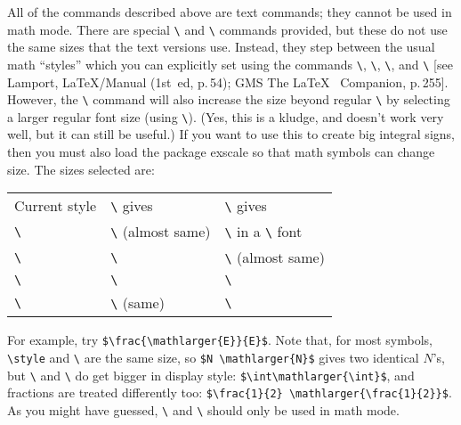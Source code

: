 \documentclass[pagesize=auto]{scrartcl}
\makeatletter
\newcommand*{\pkg}[1]{\textsf{#1}}
\newcommand*{\cs}[1]{\texttt{\textbackslash#1}}
\newcommand*{\cmd}[1]{\cs{\expandafter\@gobble\string#1}}
\makeatother
\begin{document}
\enlargethispage{-5\baselineskip}

All of the commands described above are text commands; they cannot be used
in math mode.  There are special \cmd{\mathsmaller} and \cmd{\mathlarger} commands
provided, but these do not use the same sizes that the text versions use.
Instead, they step between the usual math ``styles'' which you can explicitly
set using the commands \cmd{\displaystyle}, \cmd{\textstyle}, \cmd{\scriptstyle}, and
\cmd{\scriptscriptstyle} [see Lamport, \LaTeX/Manual (1st~ed, p.\,54); GMS The \LaTeX\ %
Companion, p.\,255]\@.  However, the \cmd{\mathlarger} command will also increase the
size beyond regular \cmd{\displaystyle} by selecting a larger regular font size
(using \cmd{\larger})\@.  (Yes, this is a kludge, and doesn't work very well, but 
it can still be useful.)  If you want to use this to create big integral 
signs, then you must also load the package \pkg{exscale} so that math symbols
can change size.  The sizes selected are:
%
\begin{flushleft}
  \small
  \begin{tabular}{@{}lll@{}}
    \toprule
    Current style            & \cmd{\mathsmaller} gives        & \cmd{\mathlarger} gives                     \\
    \cmidrule(r){1-1}         \cmidrule(lr){2-2}               \cmidrule(l){3-3}
    \cmd{\displaystyle}      & \cmd{\textstyle} (almost same)  & \cmd{\displaystyle} in a \cmd{\larger} font \\
    \cmd{\textstyle}         & \cmd{\scriptstyle}              & \cmd{\displaystyle} (almost same)           \\
    \cmd{\scriptstyle}       & \cmd{\scriptscriptstyle}        & \cmd{\textstyle}                            \\
    \cmd{\scriptscriptstyle} & \cmd{\scriptscriptstyle} (same) & \cmd{\scriptstyle}                          \\
    \bottomrule
  \end{tabular}
\end{flushleft}
%
For example, try \verb+$\frac{\mathlarger{E}}{E}$+.  Note that, for most symbols,
\cmd{\display\-style} and \cmd{\textstyle} are the same size, so \verb+$N \mathlarger{N}$+
gives two identical $N$'s, but \cmd{\sum} and \cmd{\int} do get bigger in display style: 
\verb+$\int\mathlarger{\int}$+, and fractions are treated differently too: 
\verb+$\frac{1}{2} \mathlarger{\frac{1}{2}}$+.  As you might have guessed, 
\cmd{\mathlarger} and \cmd{\mathsmaller} should only be used in math mode.
\end{document}
